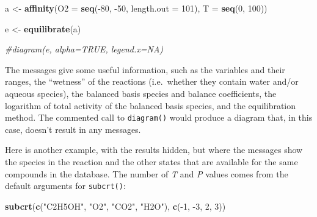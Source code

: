 \documentclass[]{tufte-handout}
\newenvironment{Shaded}{}{}
\newcommand{\KeywordTok}[1]{\textcolor[rgb]{0.00,0.44,0.13}{\textbf{#1}}}
\newcommand{\DataTypeTok}[1]{\textcolor[rgb]{0.56,0.13,0.00}{#1}}
\newcommand{\DecValTok}[1]{\textcolor[rgb]{0.25,0.63,0.44}{#1}}
\newcommand{\StringTok}[1]{\textcolor[rgb]{0.25,0.44,0.63}{#1}}
\newcommand{\CommentTok}[1]{\textcolor[rgb]{0.38,0.63,0.69}{\textit{#1}}}
\newcommand{\OperatorTok}[1]{\textcolor[rgb]{0.40,0.40,0.40}{#1}}
\newcommand{\NormalTok}[1]{#1}
\begin{document}
\begin{Shaded}
\begin{Highlighting}[]
\NormalTok{a <-}\StringTok{ }\KeywordTok{affinity}\NormalTok{(}\DataTypeTok{O2 =} \KeywordTok{seq}\NormalTok{(}\OperatorTok{-}\DecValTok{80}\NormalTok{, }\OperatorTok{-}\DecValTok{50}\NormalTok{, }\DataTypeTok{length.out =} \DecValTok{101}\NormalTok{), }\DataTypeTok{T =} \KeywordTok{seq}\NormalTok{(}\DecValTok{0}\NormalTok{, }\DecValTok{100}\NormalTok{))}
\end{Highlighting}
\end{Shaded}

\begin{Shaded}
\begin{Highlighting}[]
\NormalTok{e <-}\StringTok{ }\KeywordTok{equilibrate}\NormalTok{(a)}
\end{Highlighting}
\end{Shaded}

\begin{Shaded}
\begin{Highlighting}[]
\CommentTok{#diagram(e, alpha=TRUE, legend.x=NA)}
\end{Highlighting}
\end{Shaded}

The messages give some useful information, such as the variables and
their ranges, the ``wetness'' of the reactions (i.e.~whether they
contain water and/or aqueous species), the balanced basis species and
balance coefficients, the logarithm of total activity of the balanced
basis species, and the equilibration method. The commented call to
{\texttt{diagram()}} would produce a diagram that, in this case, doesn't
result in any messages.

Here is another example, with the results hidden, but where the messages
show the species in the reaction and the other states that are available
for the same compounds in the database. The number of \emph{T} and
\emph{P} values comes from the default arguments for
{\texttt{subcrt()}}:

\begin{Shaded}
\begin{Highlighting}[]
\KeywordTok{subcrt}\NormalTok{(}\KeywordTok{c}\NormalTok{(}\StringTok{"C2H5OH"}\NormalTok{, }\StringTok{"O2"}\NormalTok{, }\StringTok{"CO2"}\NormalTok{, }\StringTok{"H2O"}\NormalTok{), }\KeywordTok{c}\NormalTok{(}\OperatorTok{-}\DecValTok{1}\NormalTok{, }\OperatorTok{-}\DecValTok{3}\NormalTok{, }\DecValTok{2}\NormalTok{, }\DecValTok{3}\NormalTok{))}
\end{Highlighting}
\end{Shaded}
\end{document}
